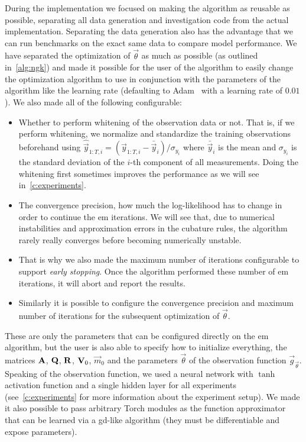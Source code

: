 	During the implementation we focused on making the algorithm as reusable as possible, separating all data generation and investigation code from the actual implementation. Separating the data generation also has the advantage that we can run benchmarks on the exact same data to compare model performance. We have separated the optimization of \(\vec{\theta}\) as much as possible (as outlined in~\autoref{alg:ngk}) and made it possible for the user of the algorithm to easily change the optimization algorithm to use in conjunction with the parameters of the algorithm like the learning rate (defaulting to Adam~\cite{kingmaAdamMethodStochastic2017} with a learning rate of \( 0.01 \)). We also made all of the following configurable:
	\begin{itemize}
		\item Whether to perform whitening of the observation data or not. That is, if we perform whitening, we normalize and standardize the training observations beforehand using \( \hat{\vec{y}}_{1:T, i} = (\vec{y}_{1:T, i} - \bar{\vec{y}}_i) / \sigma_{y_i} \) where \( \bar{\vec{y}}_i \) is the mean and \( \sigma_{y_i} \) is the standard deviation of the \(i\)-th component of all measurements. Doing the whitening first sometimes improves the performance as we will see in~\ref{c:experiments}.
		\item The convergence precision, \ie how much the log-likelihood has to change in order to continue the \ac{em} iterations. We will see that, due to numerical instabilities and approximation errors in the cubature rules, the algorithm rarely really converges before becoming numerically unstable.
		\item That is why we also made the maximum number of iterations configurable to support \emph{early stopping}. Once the algorithm performed these number of \ac{em} iterations, it will abort and report the results.
		\item Similarly it is possible to configure the convergence precision and maximum number of iterations for the subsequent optimization of \(\vec{\theta}\).
	\end{itemize}
	These are only the parameters that can be configured directly on the \ac{em} algorithm, but the user is also able to specify how to initialize everything, \ie the matrices \( \boldsymbol{\mathrm{A}} \), \( \boldsymbol{\mathrm{Q}} \), \( \boldsymbol{\mathrm{R}} \), \( \boldsymbol{\mathrm{V}}_0 \), \( \vec{m}_0 \) and the parameters \( \vec{\theta} \) of the observation function \( \vec{g}_{\vec{\theta}} \). Speaking of the observation function, we used a neural network with \( \tanh \) activation function and a single hidden layer for all experiments (see~\autoref{c:experiments} for more information about the experiment setup). We made it also possible to pass arbitrary Torch modules as the function approximator that can be learned via a \ac{gd}-like algorithm (\ie they must be differentiable and expose parameters).

